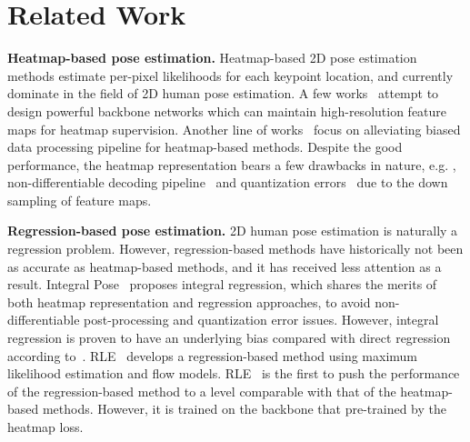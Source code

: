 \documentclass[runningheads]{llncs}
\begin{document}
\section{Related Work}


\noindent\textbf{Heatmap-based pose estimation.}
Heatmap-based 2D pose estimation methods\cite{chen2018cascaded,xiao2018simple,sun2019deep,cai2020learning,li2019rethinking,cao2019openpose,cheng2020higherhrnet,he2017mask,newell2016stacked} estimate per-pixel likelihoods for each keypoint location, and currently dominate in the field of 2D human pose estimation. 
A few works~\cite{newell2016stacked,sun2019deep,cai2020learning} attempt to design powerful backbone networks which can maintain high-resolution feature maps for heatmap supervision.
Another line of works~\cite{sun2017compositional,Zhang_2020_CVPR,huang2020devil} focus on alleviating biased data processing pipeline for heatmap-based methods. Despite the good performance, the heatmap representation bears a few drawbacks in nature, e.g. , non-differentiable decoding pipeline~\cite{sun2018integral,tian2019directpose} and quantization errors~\cite{huang2020devil,Zhang_2020_CVPR} due to the down sampling of feature maps.







\noindent\textbf{Regression-based pose estimation.}
2D human pose estimation is naturally a regression problem\cite{sun2018integral}. However, regression-based methods have historically not been as accurate as heatmap-based methods, and it has received less attention as a result\cite{2014deeppose,sun2018integral,sun2017compositional,carreira2016human,tian2019directpose,nie2019single}. 
Integral Pose~\cite{sun2018integral} proposes integral regression, which shares the merits of both heatmap representation and regression approaches, to avoid non-differentiable post-processing and quantization error issues. However, integral regression is proven to have an underlying bias compared with direct regression according to~\cite{gu2021removing}.
RLE~\cite{li2021rle} develops a regression-based method using maximum likelihood estimation and flow models. RLE~\cite{li2021rle} is the first to push the performance of the regression-based method to a level comparable with that of the heatmap-based methods. However, it is trained on the backbone that pre-trained by the heatmap loss.
\end{document}
